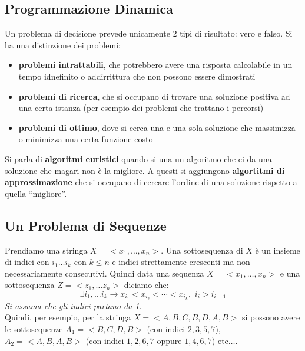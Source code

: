 \documentclass[a4paper,12pt, oneside]{book}
\begin{document}
\subsection{Programmazione Dinamica}
Un problema di decisione prevede unicamente 2 tipi di risultato: vero
e falso. Si ha una distinzione dei problemi:
\begin{itemize}
  \item \textbf{problemi intrattabili}, che potrebbero avere una
  risposta calcolabile in un tempo idnefinito o addirrittura che non
  possono essere dimostrati
  \item \textbf{problemi di ricerca}, che si occupano di trovare una
  soluzione positiva ad una certa istanza (per esempio dei problemi
  che trattano i percorsi)
  \item \textbf{problemi di ottimo}, dove si cerca una e una sola
  soluzione che massimizza o minimizza una certa funzione costo
\end{itemize}
Si parla di \textbf{algoritmi euristici} quando si una un algoritmo
che ci da una soluzione che magari non è la migliore. A questi si
aggiungono \textbf{algortitmi di approssimazione} che si occupano di
cercare l'ordine di una soluzione rispetto a quella ``migliore''.
\subsection{Un Problema di Sequenze}
Prendiamo una stringa $X=<x_1,\ldots,x_n>$. Una sottosequenza di $X$ è
un insieme di indici con $i_1\ldots i_k$ con $k\leq n$ e indici
strettamente crescenti ma non necessariamente consecutivi. Quindi data
una sequenza $X=<x_1,\ldots,x_n>$ e una sottosequenza $Z=<z_1,\ldots
z_n>$ diciamo che:
\[\exists i_1,\ldots i_k \to x_{i_1}< x_{i_2} < \cdots < x_{i_k},\,\,
  i_i > i_{i-1}\]
\textit{Si assuma che gli indici partano da 1}.\\
Quindi, per esempio, per la stringa $X=<A,B,C,B,D,A,B>$ si possono
avere le sottosequenze $A_1 = <B,C,D,B>$ (con indici $2,3,5,7$),
$A_2=<A,B,A,B>$ (con indici $1,2,6,7$ oppure $1,4,6,7$) etc$\ldots$.
\end{document}
